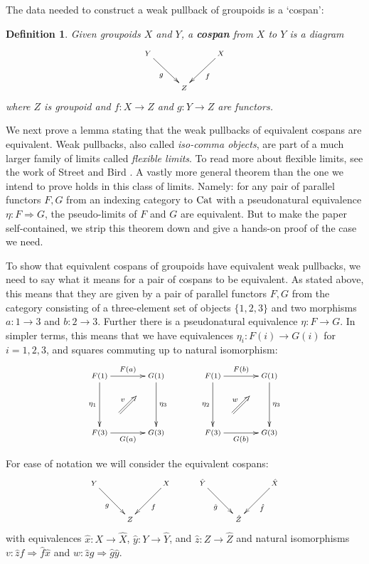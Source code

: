 \documentclass{article}
\newcommand{\Cat}{{\rm Cat}}
\newcommand{\To}{\Rightarrow}
\renewcommand{\to}{\rightarrow}
\newcommand{\maps}{\colon}
\newtheorem{definition}[thm]{Definition}
\begin{document}
The data needed to construct a weak pullback of groupoids is a
`cospan':

\begin{definition}
Given groupoids $X$ and $Y$, a {\bf cospan} from $X$ to $Y$ is a diagram
\[\xymatrix{
Y\ar[dr]_g &  & X\ar[dl]^f\\
  & Z &  \\
}\]
where $Z$ is groupoid and $f\maps X\to Z$ and $g \maps Y\to Z$ are functors.
\end{definition}

\noindent
We next prove a lemma stating that the weak pullbacks of equivalent
cospans are equivalent.  Weak pullbacks, also called {\it iso-comma
objects}, are part of a much larger family of limits called {\it
flexible limits}.  To read more about flexible limits, see the work of
Street \cite{Street:1980} and Bird \cite{Bird:1989}.  A vastly more
general theorem than the one we intend to prove holds in this class of
limits.  Namely: for any pair of parallel functors $F,G$ from an
indexing category to $\Cat$ with a pseudonatural equivalence
$\eta\maps F \To G$, the pseudo-limits of $F$ and $G$ are equivalent.
But to make the paper self-contained, we strip this theorem down and
give a hands-on proof of the case we need.

To show that equivalent cospans of groupoids have equivalent weak
pullbacks, we need to say what it means for a pair of cospans to be
equivalent.  As stated above, this means that they are given by a pair
of parallel functors $F,G$ from the category consisting of a
three-element set of objects $\lbrace 1,2,3 \rbrace$ and two morphisms
$a\maps 1 \to 3$ and $b \maps 2 \to 3$.  Further there is a
pseudonatural equivalence $\eta \maps F \to G$.  In simpler terms,
this means that we have equivalences $\eta_i \maps F(i) \to G(i)$ for 
$i = 1,2,3$, and squares commuting up to natural isomorphism:
\[
 \def\objectstyle{\scriptstyle}
  \def\labelstyle{\scriptstyle}
   \xy
   (-30,10)*+{F(1)}="1";
   (-30,-10)*+{F(3)}="2";
   (-10,10)*+{G(1)}="3";
   (-10,-10)*+{G(3)}="4";
   (10,10)*+{F(1)}="5";
   (10,-10)*+{F(3)}="6";
   (30,10)*+{G(1)}="7";
   (30,-10)*+{G(3)}="8";   
        {\ar_{\eta_1} "1";"2"};
        {\ar^{F(a)} "1";"3"};
        {\ar^{\eta_3} "3";"4"};
        {\ar_{G(a)} "2";"4"};
        {\ar_{\eta_2} "5";"6"};
        {\ar^{F(b)} "5";"7"};
        {\ar^{\eta_3} "7";"8"};
        {\ar_{G(b)} "6";"8"};
        {\ar@{=>}^{v} (-23,-3)*{}; (-17,3)*{}}; 
        {\ar@{=>}^{w} (17,-3)*{}; (23,3)*{}}; 
\endxy
\]

For ease of notation we will consider the equivalent cospans:
\[
\xymatrix{
Y\ar[dr]_{g} && X\ar[dl]^{f} & \hat{Y}\ar[dr]_{\hat{g}} && \hat{X}\ar[dl]^{\hat{f}} \\
&Z& & &\hat{Z}&
}
\]
with equivalences $\hat{x}\maps X \to \hat{X}$, $\hat{y}\maps Y \to
\hat{Y}$, and $\hat{z}\maps Z \to \hat{Z}$ and natural isomorphisms
$v\maps \hat{z}f \Rightarrow \hat{f}\hat{x}$ and $w \maps \hat{z}g
\Rightarrow \hat{g}\hat{y}$.
\end{document}
